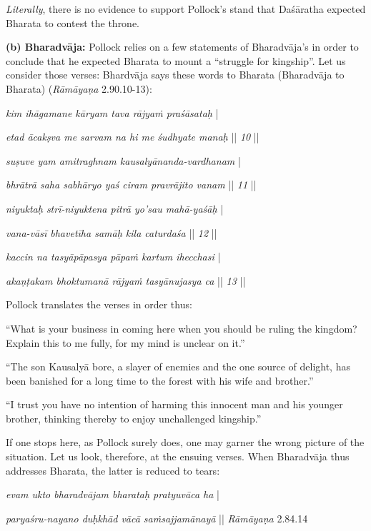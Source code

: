 {\sl Literally}, there is no evidence to support Pollock’s stand that Daśāratha expected Bharata to contest the throne. 

\smallskip
\noindent
\textbf{(b) Bharadvāja:} Pollock relies on a few statements of Bharadvāja’s in order to conclude that he expected Bharata to mount a “struggle for kingship”. Let us consider those verses: Bhardvāja says these words to Bharata (Bharadvāja to Bharata) ({\sl Rāmāyaṇa} 2.90.10-13): 

\begin{myquote}
{{\sl kim ihāgamane kāryam tava rājyaṁ praśāsataḥ}}  |

{{\sl etad ācakṣva me sarvam na hi me śudhyate manaḥ}} || {\sl 10} ||

{\sl suṣuve yam amitraghnam kausalyānanda-vardhanam} |

{\sl bhrātrā saha sabhāryo yaś ciram pravrājito vanam} || {\sl 11} ||

{\sl niyuktaḥ strī-niyuktena pitrā yo’sau mahā-yaśāḥ} |

{\sl vana-vāsī bhavetīha samāḥ kila caturdaśa} || {\sl 12} ||

\newpage

{\sl kaccin na tasyāpāpasya pāpaṁ kartum ihecchasi} |

{\sl akaṇṭakam bhoktumanā rājyaṁ tasyānujasya ca} || {\sl 13} ||
\end{myquote}

Pollock translates the verses in order thus:

\begin{myquote}
“What is your business in coming here when you should be ruling the kingdom? Explain this to me fully, for my mind is unclear on it.” 

“The son Kausalyā bore, a slayer of enemies and the one source of delight, has been banished for a long time to the forest with his wife and brother.”			 

“I trust you have no intention of harming this innocent man and his younger brother, thinking thereby to enjoy unchallenged kingship.”
\end{myquote}

If one stops here, as Pollock surely does, one may garner the wrong picture of the situation. Let us look, therefore, at the ensuing verses. When Bharadvāja thus addresses Bharata, the latter is reduced to tears:

\begin{myquote}
{{\sl evam ukto bharadvājam bharataḥ pratyuvāca ha}} |

{\sl paryaśru-nayano duḥkhād vācā saṁsajjamānayā} || {\sl Rāmāyaṇa} 2.84.14
\end{myquote}

